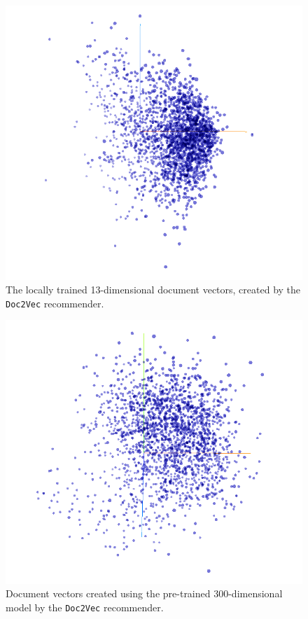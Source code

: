 \begin{figure}[H]
    \centering
    \includegraphics[scale=0.43]{obrazky-figures/doc2vec_local2.png}
    \caption{The locally trained 13-dimensional document vectors, created by the \texttt{Doc2Vec} recommender.}
    \label{ap:doc2vec_local}
\end{figure}

\begin{figure}[H]
    \centering
    \includegraphics[scale=0.43]{obrazky-figures/doc2vec_wiki.png}
    \caption{Document vectors created using the pre-trained 300-dimensional model by the \texttt{Doc2Vec} recommender.}
\end{figure}


